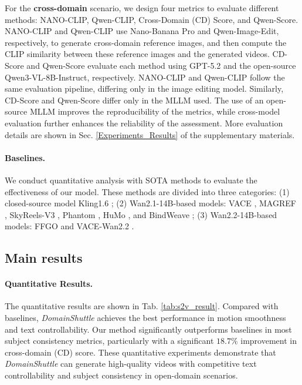 \documentclass{llmxive}
\begin{document}
For the \textbf{cross-domain} scenario, we design four metrics to evaluate different methods: NANO-CLIP, Qwen-CLIP, Cross-Domain (CD) Score, and Qwen-Score. NANO-CLIP and Qwen-CLIP use Nano-Banana Pro\cite{nano_banana} and Qwen-Image-Edit\cite{wu2025qwenimage}, respectively, to generate cross-domain reference images, and then compute the CLIP similarity between these reference images and the generated videos. CD-Score and Qwen-Score evaluate each method using GPT-5.2\cite{gpt52} and the open-source Qwen3-VL-8B-Instruct\cite{bai2025qwen3}, respectively. NANO-CLIP and Qwen-CLIP follow the same evaluation pipeline, differing only in the image editing model. Similarly, CD-Score and Qwen-Score differ only in the MLLM used. The use of an open-source MLLM improves the reproducibility of the metrics, while cross-model evaluation further enhances the reliability of the assessment. More evaluation details are shown in Sec. \ref{Experiments_Results} of the supplementary materials.


\paragraph{\textbf{Baselines.}} We conduct quantitative analysis with SOTA methods to evaluate the effectiveness of our model. These methods are divided into three categories: (1) closed-source model Kling1.6 \cite{kling}; (2) Wan2.1-14B-based models: VACE \cite{vace}, MAGREF \cite{deng2026magref}, SkyReels-V3 \cite{skyreelsv3}, Phantom \cite{phantom}, HuMo \cite{chen2025humo}, and BindWeave \cite{li2026bindweave}; (3) Wan2.2-14B-based models: FFGO \cite{chen2025first} and VACE-Wan2.2 \cite{vace}.
%

\subsection{Main results}
\paragraph{\textbf{Quantitative Results.}} The quantitative results are shown in Tab. \ref{tab:s2v_result}. Compared with baselines, \textit{DomainShuttle} achieves the best performance in motion smoothness and text controllability. Our method significantly outperforms baselines in most subject consistency metrics, particularly with a significant $18.7\%$  improvement in cross-domain (CD) score. These quantitative experiments demonstrate that \textit{DomainShuttle} can generate high-quality videos with competitive text controllability and subject consistency in open-domain scenarios.
\end{document}
